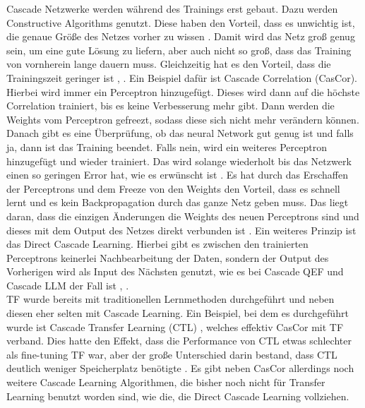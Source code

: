 Cascade Netzwerke werden während des Trainings erst gebaut. Dazu werden Constructive 
Algorithms genutzt. Diese haben den Vorteil, dass es unwichtig ist, die genaue Größe 
des Netzes vorher zu wissen \cite{Constructive_Cascade}. Damit wird das Netz groß 
genug sein, um eine gute Lösung zu liefern, aber auch nicht so groß, dass das 
Training von vornherein lange dauern muss. Gleichzeitig hat es den Vorteil, dass 
die Trainingszeit geringer ist \cite{Constructive_Cascade}, \cite{cascor}. 
Ein Beispiel dafür ist Cascade Correlation (CasCor). Hierbei wird immer ein Perceptron hinzugefügt. 
Dieses wird dann auf die höchste Correlation trainiert, bis es keine Verbesserung mehr gibt. 
Dann werden die Weights vom Perceptron gefreezt, sodass diese sich nicht mehr verändern können. 
Danach gibt es eine Überprüfung, ob das neural Network gut genug ist und falls ja, dann 
ist das Training beendet. Falls nein, wird ein weiteres Perceptron hinzugefügt und wieder 
trainiert. Das wird solange wiederholt bis das Netzwerk einen so geringen Error hat, wie 
es erwünscht ist \cite{cascor}. Es hat durch das Erschaffen der Perceptrons und dem 
Freeze von den Weights den Vorteil, dass es schnell lernt und es kein Backpropagation 
durch das ganze Netz geben muss. Das liegt daran, dass die einzigen Änderungen die Weights 
des neuen Perceptrons sind und dieses mit dem Output des Netzes direkt verbunden ist \cite{cascor}. 
Ein weiteres Prinzip ist das Direct Cascade Learning. Hierbei gibt es zwischen den trainierten 
Perceptrons keinerlei Nachbearbeitung der Daten, sondern der Output des Vorherigen wird 
als Input des Nächsten genutzt, wie es bei Cascade QEF und Cascade LLM der Fall ist \cite{cascade_network_architectures}, \cite{cascade_llm_networks}.\\

TF wurde bereits mit traditionellen Lernmethoden durchgeführt und neben diesen 
eher selten mit Cascade Learning. Ein Beispiel, bei dem es durchgeführt wurde ist Cascade Transfer 
Learning (CTL) \cite{phd_deep_cascade}, 
welches effektiv CasCor \cite{cascor} mit TF verband. Dies hatte den Effekt, dass die Performance von CTL 
etwas schlechter als fine-tuning TF war, aber der große Unterschied darin bestand, dass CTL deutlich 
weniger Speicherplatz benötigte \cite{phd_deep_cascade}. 
Es gibt neben CasCor allerdings noch weitere Cascade Learning Algorithmen, die 
bisher noch nicht für Transfer Learning benutzt worden sind, wie die, die Direct Cascade Learning 
vollziehen. 
